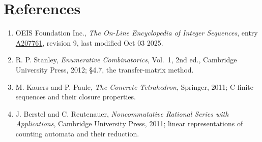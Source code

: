 \documentclass[11pt]{article}
\theoremstyle{definition}
\begin{document}
\section{References}

\begin{enumerate}

\item OEIS Foundation Inc., \emph{The On-Line Encyclopedia of Integer Sequences}, entry \href{https://oeis.org/A207761}{A207761}, revision 9, last modified Oct 03 2025.

\item R. P. Stanley, \emph{Enumerative Combinatorics}, Vol.~1, 2nd ed., Cambridge University Press, 2012; \S4.7, the transfer-matrix method.

\item M. Kauers and P. Paule, \emph{The Concrete Tetrahedron}, Springer, 2011; C-finite sequences and their closure properties.

\item J. Berstel and C. Reutenauer, \emph{Noncommutative Rational Series with Applications}, Cambridge University Press, 2011; linear representations of counting automata and their reduction.

\end{enumerate}
\end{document}
